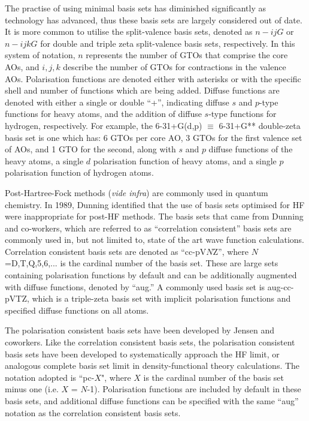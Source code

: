 The practise of using minimal basis sets has diminished significantly as
technology has advanced, thus these basis sets are largely considered out of
date. It is more common to utilise the split-valence basis sets, denoted as
$n-ijG$ or $n-ijkG$ for double and triple zeta split-valence basis sets,
respectively. In this system of notation, $n$ represents the number of GTOs that
comprise the core AOs, and $i, j, k$ describe the number of GTOs for
contractions in the valence AOs. Polarisation functions are denoted either with
asterisks or with the specific shell and number of functions which are being
added. Diffuse functions are denoted with either a single or double ``+'',
indicating diffuse $s$ and $p$-type functions for heavy atoms, and the addition
of diffuse $s$-type functions for hydrogen, respectively. For example, the
6-31+G(d,p) $\equiv$ 6-31+G** double-zeta basis set is one which has: 6 GTOs per
core AO, 3 GTOs for the first valence set of AOs, and 1 GTO for the second,
along with $s$ and $p$ diffuse functions of the heavy atoms, a single $d$
polarisation function of heavy atoms, and a single $p$ polarisation function of
hydrogen atoms.

\vspace{3mm}
\vspace{1mm}

Post-Hartree-Fock methods (\emph{vide infra}) are commonly used in quantum
chemistry. In 1989, Dunning\cite{Dunning1989} identified that the use of basis
sets optimised for HF were inappropriate for post-HF methods. The basis sets
that came from Dunning and co-workers, which are referred to as ``correlation
consistent'' basis sets are commonly used in, but not limited to, state of the
art wave function calculations. Correlation consistent basis sets are denoted as
``cc-pV$N$Z'', where $N$=D,T,Q,5,6,... is the cardinal number of the basis
set. These are large sets containing polarisation functions by default and can
be additionally augmented with diffuse functions, denoted by ``aug.'' A commonly
used basis set is aug-cc-pVTZ, which is a triple-zeta basis set with implicit
polarisation functions and specified diffuse functions on all atoms.

\vspace{3mm}
\vspace{1mm}

The polarisation consistent basis sets have been developed by Jensen and
coworkers.\cite{Jensen2001} Like the correlation consistent basis sets, the
polarisation consistent basis sets have been developed to systematically
approach the HF limit, or analogous complete basis set limit in
density-functional theory calculations. The notation adopted is ``pc-$X$", where
$X$ is the cardinal number of the basis set minus one (i.e. $X$ =
$N$-1). Polarisation functions are included by default in these basis sets, and
additional diffuse functions can be specified with the same ``aug'' notation as
the correlation consistent basis sets.

